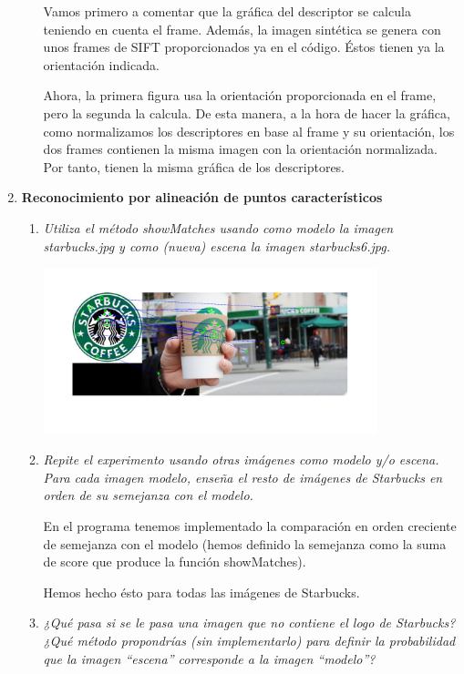 \documentclass{article}
\begin{document}
\begin{enumerate}
\begin{enumerate}
Vamos primero a comentar que la gráfica del descriptor se calcula teniendo en cuenta el frame. Además, la imagen sintética se genera con unos frames de SIFT proporcionados ya en el código. Éstos tienen ya la orientación indicada.

Ahora, la primera figura usa la orientación proporcionada en el frame, pero la segunda la calcula. De esta manera, a la hora de hacer la gráfica, como normalizamos los descriptores en base al frame y su orientación, los dos frames contienen la misma imagen con la orientación normalizada. Por tanto, tienen la misma gráfica de los descriptores.

 \end{enumerate}

\newpage

 \item \textbf{ Reconocimiento por alineación de puntos característicos}

 \begin{enumerate}
 \item \textit{Utiliza  el  método  showMatches usando  como  modelo  la  imagen 
 starbucks.jpg y como (nueva) escena la imagen starbucks6.jpg.}

\begin{center}
	\includegraphics[width=0.8\textwidth]{ej35a.png}
\end{center}

 \item \textit{Repite el experimento  usando otras imágenes  como modelo  y/o escena. 
Para cada imagen modelo, enseña el  resto de imágenes de Starbucks en orden de su semejanza con el modelo.}

En el programa tenemos implementado la comparación en orden creciente de semejanza con el modelo (hemos definido la semejanza como la suma de score que produce la función showMatches).

Hemos hecho ésto para todas las imágenes de Starbucks.

 \item \textit{¿Qué pasa si se le pasa una imagen que no contiene el logo de Starbucks? 
¿Qué  método  propondrías  (sin  implementarlo)  para  definir la 
probabilidad que la imagen “escena” corresponde a la imagen “modelo”?}


\end{enumerate}
\end{enumerate}
\end{document}
